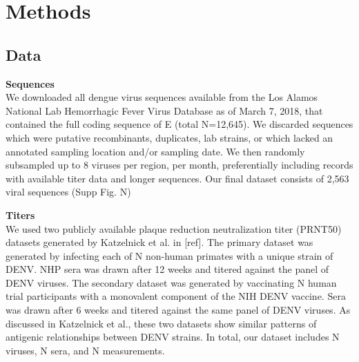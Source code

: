 \documentclass[11pt,oneside,letterpaper]{article}
\begin{document}
\newpage

\section*{Methods}
\subsection*{Data}
\textbf{Sequences}\\
We downloaded all dengue virus sequences available from the Los Alamos National Lab Hemorrhagic Fever Virus Database as of March 7, 2018, that contained the full coding sequence of E (total N=12,645).
We discarded sequences which were putative recombinants, duplicates, lab strains, or which lacked an annotated sampling location and/or sampling date.
We then randomly subsampled up to 8 viruses per region, per month, preferentially including records with available titer data and longer sequences.
Our final dataset consists of 2,563 viral sequences (Supp Fig. N)

\textbf{Titers}\\
We used two publicly available plaque reduction neutralization titer (PRNT50) datasets generated by Katzelnick et al. in {[}ref{]}.
The primary dataset was generated by infecting each of N non-human primates with a unique strain of DENV.
NHP sera was drawn after 12 weeks and titered against the panel of DENV viruses.
The secondary dataset was generated by vaccinating N human trial participants with a monovalent component of the NIH DENV vaccine.
Sera was drawn after 6 weeks and titered against the same panel of DENV viruses.
As discussed in Katzelnick et al., these two datasets show similar patterns of antigenic relationships between DENV strains.
In total, our dataset includes N viruses, N sera, and N measurements.
\end{document}
